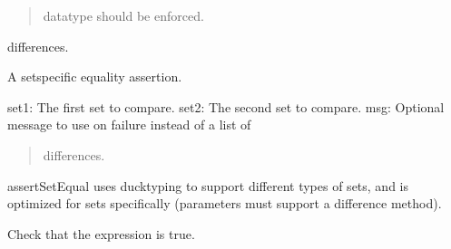 \documentclass[letterpaper,10pt,english]{sphinxmanual}
\begin{document}
\begin{fulllineitems}
\begin{fulllineitems}
\begin{description}
\begin{quote}
\sphinxAtStartPar
datatype should be enforced.
\end{quote}
\begin{description}
\sphinxAtStartPar
differences.

\end{description}

\end{description}

\end{fulllineitems}


\begin{fulllineitems}
\label{\detokenize{_autosummary/tests.test_unit.test_sqlite:tests.test_unit.test_sqlite.assertSetEqual}}
\pysigstartsignatures
{}
\pysigstopsignatures
\sphinxAtStartPar
A set\sphinxhyphen{}specific equality assertion.
\begin{description}
\sphinxAtStartPar
set1: The first set to compare.
set2: The second set to compare.
msg: Optional message to use on failure instead of a list of
\begin{quote}

\sphinxAtStartPar
differences.
\end{quote}

\end{description}

\sphinxAtStartPar
assertSetEqual uses ducktyping to support different types of sets, and
is optimized for sets specifically (parameters must support a
difference method).

\end{fulllineitems}


\begin{fulllineitems}
\label{\detokenize{_autosummary/tests.test_unit.test_sqlite:tests.test_unit.test_sqlite.assertTrue}}
\pysigstartsignatures
{}
\pysigstopsignatures
\sphinxAtStartPar
Check that the expression is true.


\end{fulllineitems}
\end{fulllineitems}
\end{document}
